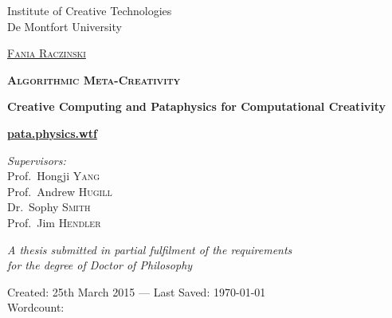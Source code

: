 
\begin{titlingpage}
\begin{center}

Institute of Creative Technologies\\
De Montfort University

\vspace{1cm}

\textsc{\huge \href{http://fania.uk}{Fania Raczinski}}

\vspace{1.5cm}


\textsc{\bfseries\scshape\sffamily \fontsize{40}{30}\selectfont Algorithmic Meta-Creativity}

\vspace{1cm}

{\huge \bfseries Creative Computing and Pataphysics for Computational Creativity}

\vspace{1cm}
{\Huge \textbf{\url{pata.physics.wtf}}}
\vspace{1.5cm}

\emph{Supervisors:}\\
{Prof.\ Hongji \textsc{Yang}}\\
{Prof.\ Andrew \textsc{Hugill}}\\
{Dr.\ Sophy \textsc{Smith}}\\
{Prof.\ Jim \textsc{Hendler}}

\vspace{1.5cm}

\large \emph{A thesis submitted in partial fulfilment of the requirements\\ for the degree of Doctor of Philosophy}

\vfill

Created: {25th March 2015} --- Last Saved: {\today}\\
Wordcount: \wordcount

\end{center}
\end{titlingpage}
